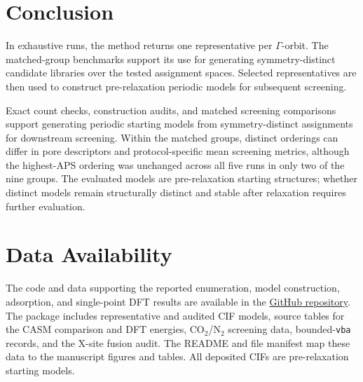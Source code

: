 \documentclass[a5paper, 10pt]{article}
\begin{document}
\section{Conclusion}
\label{sec:discussion}
In exhaustive runs, the method returns one representative per $\Gamma$-orbit. The matched-group benchmarks support its use for generating symmetry-distinct candidate libraries over the tested assignment spaces. Selected representatives are then used to construct pre-relaxation periodic models for subsequent screening.

Exact count checks, construction audits, and matched screening comparisons support generating periodic starting models from symmetry-distinct assignments for downstream screening. Within the matched groups, distinct orderings can differ in pore descriptors and protocol-specific mean screening metrics, although the highest-APS ordering was unchanged across all five runs in only two of the nine groups. The evaluated models are pre-relaxation starting structures; whether distinct models remain structurally distinct and stable after relaxation requires further evaluation.

\section*{Data Availability}
\label{sec:data}
The code and data supporting the reported enumeration, model construction, adsorption, and single-point DFT results are available in the \href{https://github.com/Buct454/mof-enumeration-reconstruction.git}{GitHub repository}. The package includes representative and audited CIF models, source tables for the CASM comparison and DFT energies, CO$_2$/N$_2$ screening data, bounded-\texttt{vba} records, and the X-site fusion audit. The README and file manifest map these data to the manuscript figures and tables. All deposited CIFs are pre-relaxation starting models.
\end{document}
